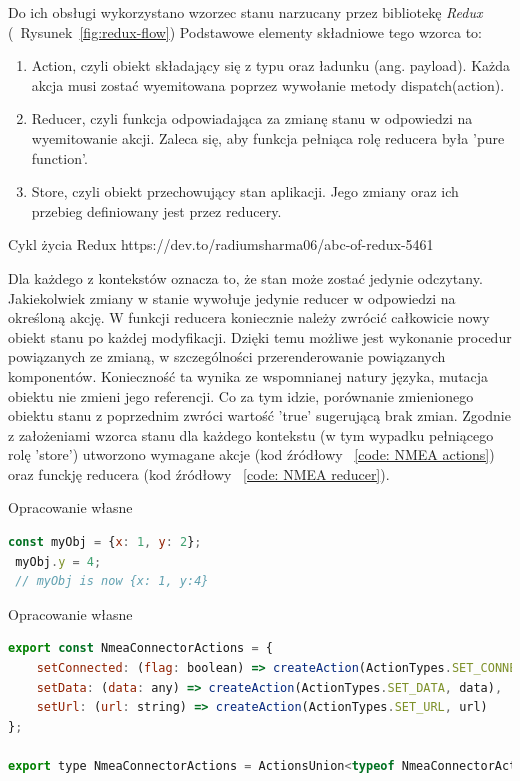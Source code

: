 \documentclass[skorowidz,skroty]{dyplomWEZUT}
\begin{document}
Do ich obsługi wykorzystano wzorzec stanu narzucany przez bibliotekę \textit{Redux} \cite{Redux, ReduxABC} (~Rysunek~\ref{fig:redux-flow}) Podstawowe elementy składniowe tego wzorca to:
\begin{enumerate}

	\item Action, czyli obiekt składający się z typu oraz ładunku (ang. payload). Każda akcja musi zostać wyemitowana poprzez wywołanie metody dispatch(action). 
	
	\item Reducer, czyli funkcja odpowiadająca za zmianę stanu w odpowiedzi na wyemitowanie akcji. Zaleca się, aby funkcja pełniąca rolę reducera była 'pure function'.  
	
	\item Store, czyli obiekt przechowujący stan aplikacji. Jego zmiany oraz ich przebieg definiowany jest przez reducery. 
	
\end{enumerate}

{Cykl życia Redux \label{fig:redux-flow}}
{https://dev.to/radiumsharma06/abc-of-redux-5461}

 Dla każdego z kontekstów oznacza to, że stan może zostać jedynie odczytany. Jakiekolwiek zmiany w stanie wywołuje jedynie reducer w odpowiedzi na określoną akcję. W funkcji reducera koniecznie należy zwrócić całkowicie nowy obiekt stanu po każdej modyfikacji. Dzięki temu możliwe jest wykonanie procedur powiązanych ze zmianą, w szczególności przerenderowanie powiązanych komponentów. Konieczność ta wynika ze wspomnianej natury języka, mutacja obiektu nie zmieni jego referencji. Co za tym idzie, porównanie zmienionego obiektu stanu z poprzednim zwróci wartość 'true' sugerującą brak zmian. Zgodnie z założeniami wzorca stanu dla każdego kontekstu (w tym wypadku pełniącego rolę 'store') utworzono wymagane akcje (kod źródłowy ~\ref{code: NMEA actions}) oraz funckję reducera (kod źródłowy ~\ref{code: NMEA reducer}).

{Opracowanie własne}{\label{code: js mutate}}
\begin{lstlisting}[language=JavaScript]
 const myObj = {x: 1, y: 2};
 myObj.y = 4;
 // myObj is now {x: 1, y:4}
\end{lstlisting}


{Opracowanie własne}{\label{code: NMEA actions}}
\begin{lstlisting}[language=JavaScript]
export const NmeaConnectorActions = {
    setConnected: (flag: boolean) => createAction(ActionTypes.SET_CONNECTED, flag),
    setData: (data: any) => createAction(ActionTypes.SET_DATA, data),
    setUrl: (url: string) => createAction(ActionTypes.SET_URL, url)
};

export type NmeaConnectorActions = ActionsUnion<typeof NmeaConnectorActions>;

\end{lstlisting}
\end{document}
